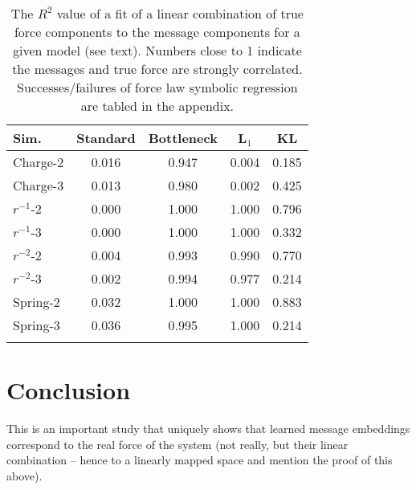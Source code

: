 \documentclass{article}
\begin{document}
 
\begin{table}[h]
    \centering
\begin{tabular}{@{}lcccc@{}}
    \toprule
        Sim. &         Standard &                Bottleneck &                   L$_1$       &                   KL      \\ \midrule
    Charge-2 &           0.016  &                   0.947   &                   0.004       &                 0.185     \\                                      
    Charge-3 &           0.013  &                   0.980   &                   0.002       &                 0.425     \\                             
    $r^{-1}$-2 &         0.000  &                   1.000   &                   1.000       &                 0.796     \\                                 
    $r^{-1}$-3 &         0.000  &                   1.000   &                   1.000       &                 0.332     \\                                
    $r^{-2}$-2 &         0.004  &                   0.993   &                   0.990       &                 0.770     \\                                
    $r^{-2}$-3 &         0.002  &                   0.994   &                   0.977       &                 0.214     \\                                
    Spring-2 &           0.032  &                   1.000   &                   1.000       &                 0.883     \\                                
    Spring-3 &           0.036  &                   0.995   &                   1.000       &                 0.214     \\ \bottomrule\\
\end{tabular}
\caption{The $R^2$ value of a fit of
    a linear combination of true force components to the message components
    for a given model (see text).
    Numbers close to 1 indicate the messages and true force are strongly correlated.
    Successes/failures of force law symbolic regression are tabled in the appendix.
    }
\label{tbl:forcefit}
\end{table}


\section{Conclusion}
This is an important study that uniquely shows that learned message embeddings correspond to the real force of the system (not really, but their linear combination -- hence to a linearly mapped space and mention the proof of this above).
\end{document}
